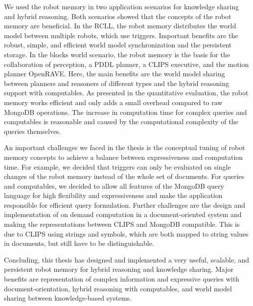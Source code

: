 We used the robot memory in two application scenarios for knowledge
sharing and hybrid reasoning. Both scenarios showed that the concepts
of the robot memory are beneficial. In the RCLL, the robot memory
distributes the world model between multiple robots, which use
triggers. Important benefits are the robust, simple, and efficient
world model synchronization and the persistent storage. In the blocks
world scenario, the robot memory is the basis for the collaboration of
perception, a PDDL planner, a CLIPS executive, and the motion planner
OpenRAVE. Here, the main benefits are the world model sharing between
planners and reasoners of different types and the hybrid reasoning
support with computables.  As presented in the quantitative
evaluation, the robot memory works efficient and only adds a small
overhead compared to raw MongoDB operations. The increase in
computation time for complex queries and computables is reasonable and
caused by the computational complexity of the queries themselves.

An important challenges we faced in the thesis is the conceptual
tuning of robot memory concepts to achieve a balance between
expressiveness and computation time. For example, we decided that
triggers can only be evaluated on single changes of the robot memory
instead of the whole set of documents. For queries and computables, we
decided to allow all features of the MongoDB query language for high
flexibility and expressiveness and make the application responsible
for efficient query formulation.  Further challenges are the design
and implementation of on demand computation in a document-oriented
system and making the representations between CLIPS and MongoDB
compatible. This is due to CLIPS using strings and symbols, which are
both mapped to string values in documents, but still have to be
distinguishable.

Concluding, this thesis has designed and implemented a very useful,
scalable, and persistent robot memory for hybrid reasoning and
knowledge sharing. Major benefits are representation of
complex information and expressive queries with document-orientation,
hybrid reasoning with computables, and world model sharing between
knowledge-based systems.

